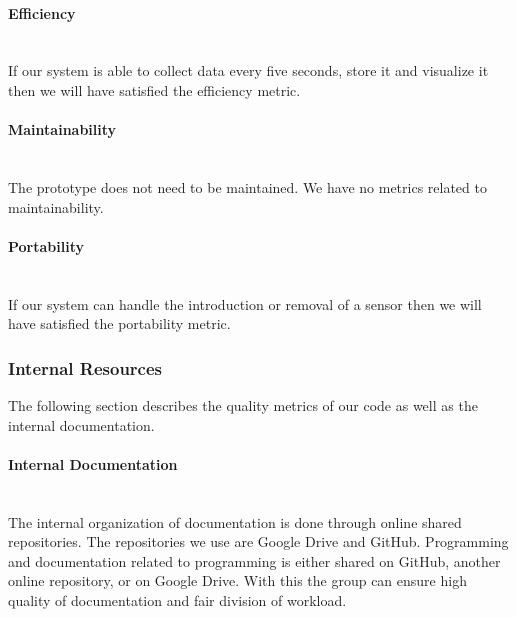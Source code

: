 \documentclass[../document.tex]{subfiles}
\begin{document}
\paragraph{Efficiency} \ \\
If our system is able to collect data every five seconds, store it and visualize it then we will have satisfied the efficiency metric.

\paragraph{Maintainability} \ \\
The prototype does not need to be maintained. We have no metrics related to maintainability.

\paragraph{Portability} \ \\
If our system can handle the introduction or removal of a sensor then we will have satisfied the portability metric.


\subsubsection{Internal Resources}
The following section describes the quality metrics of our code as well as the internal documentation.

\paragraph{Internal Documentation} \ \\
The internal organization of documentation is done through online shared repositories. The repositories we use are Google Drive and GitHub. Programming and documentation related to programming is either shared on GitHub, another online repository, or on Google Drive. With this the group can ensure high quality of documentation and fair division of workload.
\end{document}
